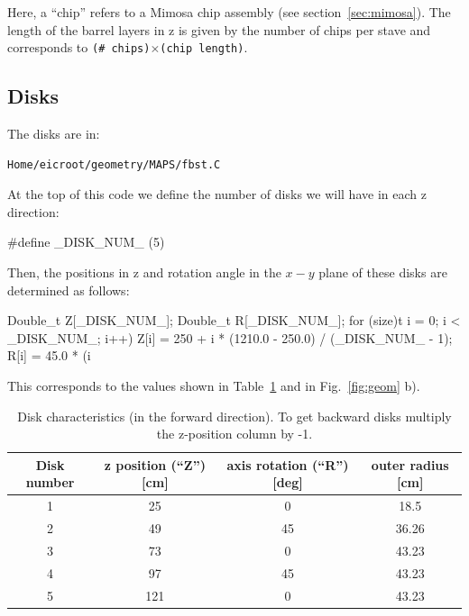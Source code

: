 \documentclass[12pt]{article}
\begin{document}
Here, a ``chip'' refers to a Mimosa chip assembly (see section~\ref{sec:mimosa}).
The length of the barrel layers in z is given by
the number of chips per stave and corresponds to \verb|(# chips)|$\times$\verb|(chip length)|.

\subsection{Disks}

The disks are in:

\begin{tcolorbox}
\begin{verbatim}
Home/eicroot/geometry/MAPS/fbst.C
\end{verbatim}  
\end{tcolorbox}

At the top of this code we define the number of disks we will have in each z direction:

\begin{tcolorbox}
\begin{verbnobox}[\scriptsize]
#define _DISK_NUM_ (5)
\end{verbnobox}  
\end{tcolorbox}

Then, the positions in z and rotation angle in the $x-y$ plane of these disks are determined as follows:

\begin{tcolorbox}
\begin{verbnobox}[\scriptsize]
Double_t Z[_DISK_NUM_];
Double_t R[_DISK_NUM_];
for (size)t i = 0; i  < _DISK_NUM_; i++) {
      Z[i] = 250 + i * (1210.0 - 250.0) / (_DISK_NUM_ - 1);
      R[i] = 45.0 * (i %
}
\end{verbnobox}  
\end{tcolorbox}

This corresponds to the values shown in Table~\ref{tab:disks}
and in Fig.~\ref{fig:geom} b).

\begin{table}[H]
\centering
\caption{Disk characteristics (in the forward direction). To get backward disks multiply the z-position column by -1.}
\label{tab:disks}
\begin{tabular}{c|ccc}
\hline
Disk number 	& z position (``Z'') {[}cm{]} 	& axis rotation (``R'') {[}deg{]}	& outer radius {[}cm{]} \\
\hline \hline
1           		& 25                  	&	0				& 18.5                  \\
2           		& 49                  	&	45				& 36.26                 \\
3           		& 73                  	&	0				& 43.23                 \\
4           		& 97                  	&	45				& 43.23                 \\
5           		& 121                	&	0				& 43.23                
\end{tabular}
\end{table}
\end{document}
